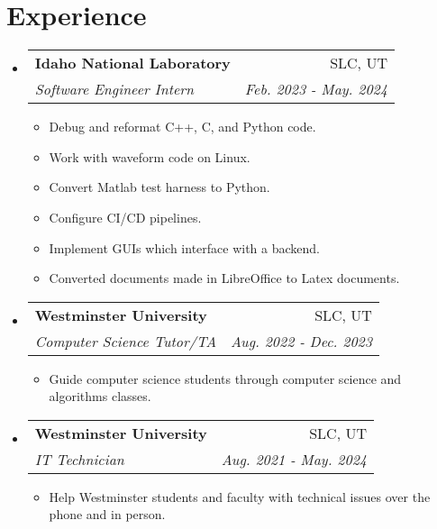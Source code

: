 \documentclass[letterpaper,11pt]{article}
\makeatletter
\newcommand{\resumeSubheading}[4]{
\vspace{-1pt}\item[]
    \begin{tabular*}{0.97\textwidth}{l@{\extracolsep{\fill}}r}
      \textbf{#1} & #2 \\
      \textit{\small#3} & \textit{\small #4} \\
    \end{tabular*}\vspace{-5pt}
}
\newcommand{\resumeSubHeadingListStart}{\begin{itemize}[leftmargin=*]}
\newcommand{\resumeSubHeadingListEnd}{\end{itemize}}
\makeatother
\begin{document}
\section{Experience}
  \resumeSubHeadingListStart
    \resumeSubheading
      {Idaho National Laboratory}{SLC, UT}
      {Software Engineer Intern}{Feb. 2023 - May. 2024}
      \begin{itemize}[before=\vspace{-0.85em},after=\vspace{-1em}]
          \small 
          \itemsep 0.0em
          \item Debug and reformat C++, C, and Python code.
          \item Work with waveform code on Linux.
          \item Convert Matlab test harness to Python.
          \item Configure CI/CD pipelines.
          \item Implement GUIs which interface with a backend.
          \item Converted documents made in LibreOffice to Latex documents.
      \end{itemize}

    \resumeSubheading
      {Westminster University}{SLC, UT}
      {Computer Science Tutor/TA}{Aug. 2022 - Dec. 2023}
      \begin{itemize}[before=\vspace{-0.85em},after=\vspace{-1em}]
          \small 
          \item Guide computer science students through computer science and algorithms classes.
      \end{itemize}

    \resumeSubheading
      {Westminster University}{SLC, UT}
      {IT Technician}{Aug. 2021 - May. 2024}
      \begin{itemize}[before=\vspace{-0.85em},after=\vspace{-1em}]
          \small 
          \item Help Westminster students and faculty with technical issues over the phone and in person.
      \end{itemize}
  \resumeSubHeadingListEnd


\end{document}
